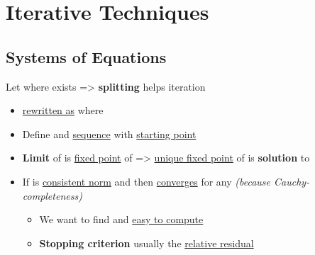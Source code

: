 \section*{Iterative Techniques}

\subsection*{Systems of Equations}

Let  where 
exists => \textbf{splitting}  helps iteration
\begin{itemize}

      \item
             \underline{rewritten as}
             where
      \item
            Define  and \underline{sequence}
            with \underline{starting point} 
      \item
            \textbf{Limit} of  is \underline{fixed point} of  => \underline{unique fixed point} of 
            is \textbf{solution} to 
      \item
            If \iMbox{\lVert - \rVert} is \underline{consistent norm} and
             then  \underline{converges} for any
             \emph{(because Cauchy-completeness)}
            \begin{itemize}

                  \item
                        We want to find  and \underline{easy to compute} 
                  \item
                        \textbf{Stopping criterion} usually the \underline{relative residual}
            \end{itemize}
\end{itemize}

\hSep %

